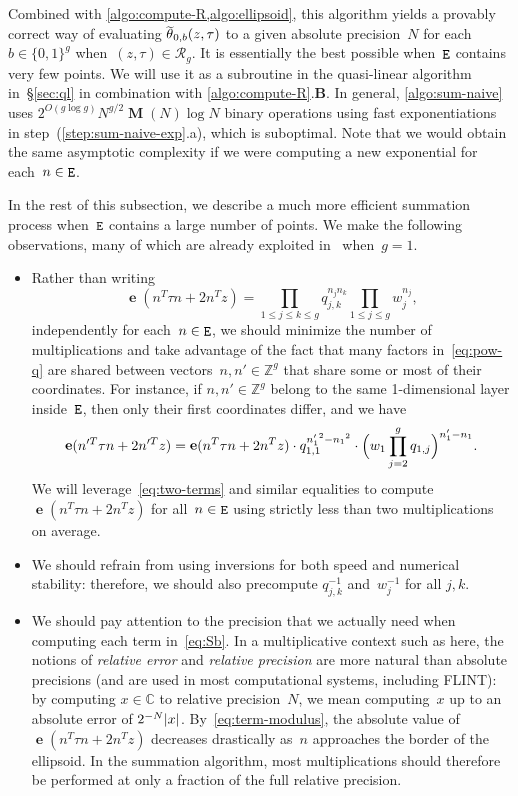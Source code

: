 \documentclass[12pt,oneside]{amsart}
\numberwithin{equation}{section}
\theoremstyle{definition}
\newcommand{\Z}{\mathbb{Z}}
\newcommand{\red}{\mathcal{R}}
\newcommand{\C}{\mathbb{C}}
\DeclareMathOperator{\E}{\tt E}
\DeclareMathOperator{\thetatilde}{\rlap{\raisebox{-0.1ex}{$\widetilde{\phantom{\,t}}$}}\theta}
\DeclareMathOperator{\e}{\mathbf{e}}
\DeclareMathOperator{\Mul}{\mathbf{M}}
\DeclarePairedDelimiter{\abs}{|}{|}
\DeclarePairedDelimiter{\paren}{(}{)}
\begin{document}
Combined with \cref{algo:compute-R,algo:ellipsoid}, this algorithm yields a
provably correct way of evaluating $\thetatilde_{0,b}(z,\tau)$ to a given
absolute precision~$N$ for each~$b\in \{0,1\}^g$ when~$(z,\tau) \in \red_g$. It
is essentially the best possible when~$\E$ contains very few points. We will
use it as a subroutine in the quasi-linear algorithm in~§\ref{sec:ql} in
combination with \cref{algo:compute-R}.\textbf{B}. In general,
\cref{algo:sum-naive} uses $2^{O(g\log g)} N^{g/2}\Mul(N)\log N$ binary
operations using fast exponentiations in step~(\ref{step:sum-naive-exp}.a),
which is suboptimal. Note that we would obtain the same asymptotic complexity
if we were computing a new exponential for each~$n\in \E$.

In the rest of this subsection, we describe a much more efficient summation
process when~$\E$ contains a large number of points. We make the following
observations, many of which are already exploited
in~\cite{engeShortAdditionSequences2018} when~$g=1$.
\begin{itemize}
\item Rather than writing
  \begin{equation}
    \label{eq:pow-q}
    \e(n^T\tau n + 2n^T z) = \prod_{1\leq j\leq k\leq g} q_{j,k}^{n_j n_k}
    \prod_{1\leq j\leq g} w_j^{n_j},
  \end{equation}
  independently for each~$n\in\E$, we should minimize the number of
  multiplications and take advantage of the fact that many factors
  in~\eqref{eq:pow-q} are shared between vectors~$n,n'\in \Z^g$ that share some
  or most of their coordinates. For instance, if $n,n'\in \Z^g$ belong to the
  same 1-dimensional layer inside~$\E$, then only their first coordinates
  differ, and we have
  \begin{equation}
    \label{eq:two-terms}
    \e(n'^T\tau n + 2n'^T z) = \e(n^T\tau n + 2n^T z) \cdot q_{1,1}^{{n'_1}^2 - {n_1}^2} \cdot
    \paren[\Big]{w_1 \prod_{j=2}^{g} q_{1,j}}^{n'_1 - n_1}.
  \end{equation}
  We will leverage~\eqref{eq:two-terms} and similar equalities to compute
  $\e(n^T\tau n + 2n^T z)$ for all~$n\in \E$ using strictly less than two
  multiplications on average.
\item We should refrain from using inversions for both speed and numerical
  stability: therefore, we should also precompute $q_{j,k}^{-1}$ and~$w_j^{-1}$
  for all $j,k$.
\item We should pay attention to the precision that we actually need when
  computing each term in~\eqref{eq:Sb}. In a multiplicative context such as
  here, the notions of \emph{relative error} and \emph{relative precision} are
  more natural than absolute precisions (and are used in most computational
  systems, including FLINT): by computing $x\in \C$ to relative precision~$N$,
  we mean computing~$x$ up to an absolute error of
  $2^{-N}\abs{x}$. By~\eqref{eq:term-modulus}, the absolute value of
  $%
  {\e(n^T\tau n + 2n^Tz)}$ decreases drastically as~$n$ approaches the border
  of the ellipsoid. In the summation algorithm, most multiplications should
  therefore be performed at only a fraction of the full relative precision.
\end{itemize}
\end{document}
